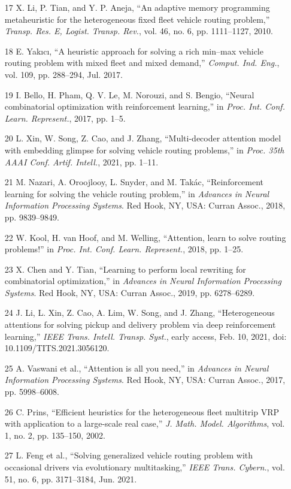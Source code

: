 \documentclass{article}
\begin{document}
\begin{itemize}
		\item [17] X. Li, P. Tian, and Y. P. Aneja, “An adaptive memory programming metaheuristic for the heterogeneous fixed fleet vehicle routing problem,” \textit{Transp. Res. E, Logist. Transp. Rev.}, vol. 46, no. 6, pp. 1111–1127, 2010.
		\item [18] E. Yakıcı, “A heuristic approach for solving a rich min–max vehicle routing problem with mixed fleet and mixed demand,” \textit{Comput. Ind. Eng.}, vol. 109, pp. 288–294, Jul. 2017.
		\item [19] I. Bello, H. Pham, Q. V. Le, M. Norouzi, and S. Bengio, “Neural combinatorial optimization with reinforcement learning,” in \textit{Proc. Int. Conf. Learn. Represent.}, 2017, pp. 1–5.
		\item [20] L. Xin, W. Song, Z. Cao, and J. Zhang, “Multi-decoder attention model with embedding glimpse for solving vehicle routing problems,” in \textit{Proc. 35th AAAI Conf. Artif. Intell.}, 2021, pp. 1–11.
		\item [21] M. Nazari, A. Oroojlooy, L. Snyder, and M. Takác, “Reinforcement learning for solving the vehicle routing problem,” in \textit{Advances in Neural Information Processing Systems}. Red Hook, NY, USA: Curran Assoc., 2018, pp. 9839–9849.
		\item [22] W. Kool, H. van Hoof, and M. Welling, “Attention, learn to solve routing problems!” in \textit{Proc. Int. Conf. Learn. Represent.}, 2018, pp. 1–25.
		\item [23] X. Chen and Y. Tian, “Learning to perform local rewriting for combinatorial optimization,” in \textit{Advances in Neural Information Processing Systems}. Red Hook, NY, USA: Curran Assoc., 2019, pp. 6278–6289.
		\item [24] J. Li, L. Xin, Z. Cao, A. Lim, W. Song, and J. Zhang, “Heterogeneous attentions for solving pickup and delivery problem via deep reinforcement learning,” \textit{IEEE Trans. Intell. Transp. Syst.}, early access, Feb. 10, 2021, doi: 10.1109/TITS.2021.3056120.
		\item [25] A. Vaswani et al., “Attention is all you need,” in \textit{Advances in Neural Information Processing Systems}. Red Hook, NY, USA: Curran Assoc., 2017, pp. 5998–6008.
		\item [26] C. Prins, “Efficient heuristics for the heterogeneous fleet multitrip VRP with application to a large-scale real case,” \textit{J. Math. Model. Algorithms}, vol. 1, no. 2, pp. 135–150, 2002.
		\item [27] L. Feng et al., “Solving generalized vehicle routing problem with occasional drivers via evolutionary multitasking,” \textit{IEEE Trans. Cybern.}, vol. 51, no. 6, pp. 3171–3184, Jun. 2021.

\end{itemize}
\end{document}
